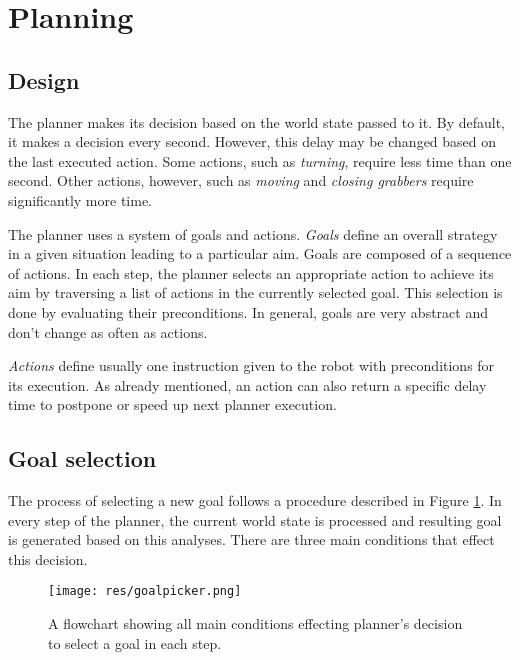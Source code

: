 \section{Planning}

\subsection{Design}

The planner makes its decision based on the world state passed to it. By default, it makes a decision every second. However, this delay may be changed based on the last executed action. Some actions, such as \emph{turning}, require less time than one second. Other actions, however, such as \emph{moving} and \emph{closing grabbers} require significantly more time.


The planner uses a system of goals and actions. \emph{Goals} define an overall strategy in a given situation leading to a particular aim. Goals are composed of a sequence of actions. In each step, the planner selects an appropriate action to achieve its aim by traversing a list of actions in the currently selected goal. This selection is done by evaluating their preconditions. In general, goals are very abstract and don't change as often as actions.

\emph{Actions} define usually one instruction given to the robot with preconditions for its execution. As already mentioned, an action can also return a specific delay time to postpone or speed up next planner execution.



\subsection{Goal selection}

The process of selecting a new goal follows a procedure described in Figure
\ref{fig:goalpicker}. In every step of the planner, the current world state is
processed and resulting goal is generated based on this analyses. There are
three main conditions that effect this decision.


\begin{figure}[H]
	\begin{center}
    \texttt{[image: res/goalpicker.png]}
    \caption{A flowchart showing all main conditions effecting planner's decision to select a goal in each step.}
    \label{fig:goalpicker}
	\end{center}
\end{figure}

